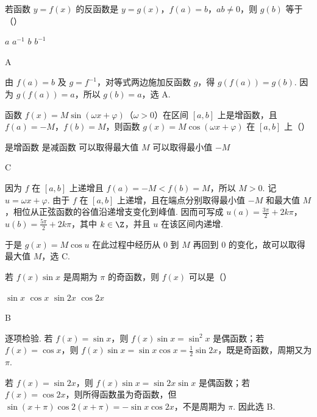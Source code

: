 \documentclass[UTF8,a4paper,oneside,11pt]{ctexbook}
\begin{document}
\begin{problem}
若函数 \(y=f(x)\) 的反函数是 \(y=g(x)\)，\(f(a)=b\)，\(ab\neq0\)，则 \(g(b)\) 等于（\quad）

\choices
    {\(a\)}
    {\(a^{-1}\)}
    {\(b\)}
    {\(b^{-1}\)}
\end{problem}

\begin{answer}
A
\end{answer}

\begin{solution}
由 \(f(a)=b\) 及 \(g=f^{-1}\)，对等式两边施加反函数 \(g\)，得
\(g(f(a))=g(b)\). 因为 \(g(f(a))=a\)，所以 \(g(b)=a\)，选 A.
\end{solution}

\begin{problem}
函数 \(f(x) = M \sin (\omega x + \varphi)\)（\(\omega > 0\)）在区间 \([a, b]\) 上是增函数，且 \(f(a) = -M\)，\(f(b) = M\)，则函数 \(g(x) = M \cos (\omega x + \varphi)\) 在 \([a, b]\) 上（\quad）

\choices
    {是增函数}
    {是减函数}
    {可以取得最大值 \(M\)}
    {可以取得最小值 \(-M\)}
\end{problem}

\begin{answer}
C
\end{answer}

\begin{solution}
因为 \(f\) 在 \([a,b]\) 上递增且 \(f(a)=-M<f(b)=M\)，所以 \(M>0\). 记 \(u=\omega x+\varphi\). 由于 \(f\) 在 \([a,b]\) 上递增，且在端点分别取得最小值 \(-M\) 和最大值 \(M\)，相位从正弦函数的谷值沿递增支变化到峰值. 因而可写成
\(u(a)=\frac{3\pi}{2}+2k\pi\)，\(u(b)=\frac{5\pi}{2}+2k\pi\)，其中 \(k\in\Z\)，并且 \(u\) 在该区间内递增.

于是 \(g(x)=M\cos u\) 在此过程中经历从 \(0\) 到 \(M\) 再回到 \(0\) 的变化，故可以取得最大值 \(M\)，选 C.
\end{solution}

\begin{problem}
若 \(f(x) \sin x \) 是周期为 \(\pi \) 的奇函数，则 \(f(x) \) 可以是（\quad）

\choices
    {\(\sin x\)}
    {\(\cos x\)}
    {\(\sin 2x\)}
    {\(\cos 2x\)}
\end{problem}

\begin{answer}
B
\end{answer}

\begin{solution}
逐项检验. 若 \(f(x)=\sin x\)，则 \(f(x)\sin x=\sin^2x\) 是偶函数；若 \(f(x)=\cos x\)，则
\(f(x)\sin x=\sin x\cos x=\frac12\sin2x\)，既是奇函数，周期又为 \(\pi\).

若 \(f(x)=\sin2x\)，则 \(f(x)\sin x=\sin2x\sin x\) 是偶函数；若 \(f(x)=\cos2x\)，则所得函数虽为奇函数，但
\(\sin(x+\pi)\cos2(x+\pi)=-\sin x\cos2x\)，不是周期为 \(\pi\). 因此选 B.
\end{solution}
\end{document}
